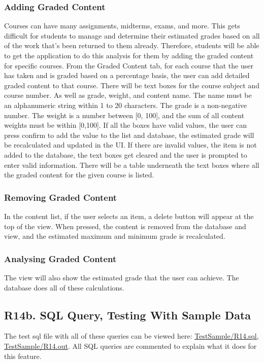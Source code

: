 \documentclass[12pt, a4paper]{article}
\begin{document}
\subsubsection*{Adding Graded Content}
Courses can have many assignments, midterms, exams, and more. This gets difficult for students to manage and determine their estimated grades based on all of the work that's been returned to them already. Therefore, students will be able to get the application to do this analysis for them by adding the graded content for specific courses. From the Graded Content tab, for each course that the user has taken and is graded based on a percentage basis, the user can add detailed graded content to that course. There will be text boxes for the course subject and course number. As well as grade, weight, and content name. The name must be an alphanumeric string within 1 to 20 characters. The grade is a non-negative number. The weight is a number between [0, 100], and the sum of all content weights must be within [0,100]. If all the boxes have valid values, the user can press confirm to add the value to the list and database, the estimated grade will be recalculated and updated in the UI. If there are invalid values, the item is not added to the database, the text boxes get cleared and the user is prompted to enter valid information. There will be a table underneath the text boxes where all the graded content for the given course is listed.
\subsubsection*{Removing Graded Content}
In the content list, if the user selects an item, a delete button will appear at the top of the view. When pressed, the content is removed from the database and view, and the estimated maximum and minimum grade is recalculated.
\subsubsection*{Analysing Graded Content}
The view will also show the estimated grade that the user can achieve. The database does all of these calculations.
\subsection*{R14b. SQL Query, Testing With Sample Data}
The test sql file with all of these queries can be viewed here: \underline{\href{https://github.com/Kggupta/DegreeMap/tree/main/Database/Queries/TestSample}{TestSample/R14.sql}}, \underline{\href{https://github.com/Kggupta/DegreeMap/tree/main/Database/Queries/TestSample}{TestSample/R14.out}}. All SQL queries are commented to explain what it does for this feature.
\end{document}
